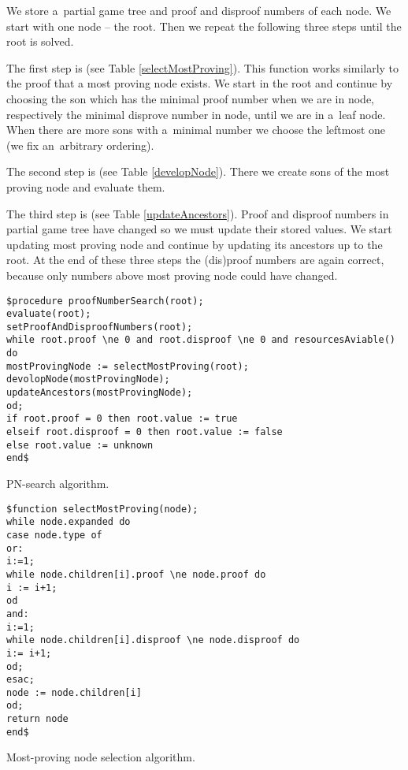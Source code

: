 We store a~partial game tree and proof and disproof numbers of each node. We
start with one node -- the root. Then we repeat the following three steps
until the root is solved. 

\medskip

The first step is  (see Table
\ref{selectMostProving}). This function works similarly to the proof that a
most proving node exists.  We start in the root and continue by
choosing the son which has the minimal proof number when we are in 
node, respectively the minimal disprove number in  node, until we are
in a~leaf node. When there are more sons with a~minimal number we choose the
leftmost one (we fix an~arbitrary ordering). 

The second step is  (see Table
\ref{developNode}). There we create sons of the most proving node and evaluate
them.

The third step is  (see Table
\ref{updateAncestors}). Proof and disproof numbers in partial game tree have
changed so we must update their stored values. We start updating most proving
node and continue by updating its ancestors up to the root. At the end of these
three steps the (dis)proof numbers are again correct, because only numbers
above most proving node could have changed.

\begin{table}
\begin{verbatim}
$procedure proofNumberSearch(root);
evaluate(root);
setProofAndDisproofNumbers(root);
while root.proof \ne 0 and root.disproof \ne 0 and resourcesAviable() do
mostProvingNode := selectMostProving(root);
devolopNode(mostProvingNode);
updateAncestors(mostProvingNode);
od;
if root.proof = 0 then root.value := true
elseif root.disproof = 0 then root.value := false
else root.value := unknown
end$
\end{verbatim}
\caption{PN-search algorithm.}
\label{pn-searchcode}
\end{table}

\begin{table}
\begin{verbatim}
$function selectMostProving(node);
while node.expanded do
case node.type of
or:
i:=1;
while node.children[i].proof \ne node.proof do
i := i+1;
od
and:
i:=1;
while node.children[i].disproof \ne node.disproof do
i:= i+1;
od;
esac;
node := node.children[i]
od;
return node
end$
\end{verbatim}
\caption{Most-proving node selection algorithm.}
\label{selectMostProving}
\end{table}

